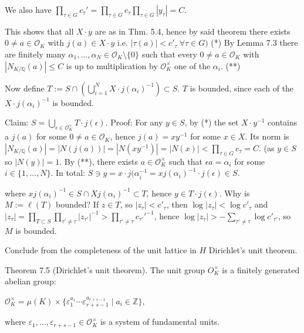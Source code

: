 We also have 
\(\prod_{\tau \in G} c_\tau' = \prod_{\tau \in G} c_\tau \prod_{\tau \in G} |y_\tau| = C\).

This shows that all \(X \cdot y\) are as in Thm. 5.4, hence by said theorem there exists
\(0 \neq a \in \mathcal{O}_K\) with \(j(a) \in X \cdot y\) i.e. \(|\tau(a)| < c'_\tau \ \forall \tau \in G)\) (*)
By Lemma 7.3 there are finitely many \(\alpha_1, \ldots, \alpha_N \in \mathcal{O}_K \setminus \{0\}\) such that every \(0 \neq a \in \mathcal{O}_K\) 
with \(|N_{K/\mathbb{Q}}(a)| \leq C\) is up to multiplication by \(\mathcal{O}_K^{\times}\) one of the \(\alpha_i\). (**)

Now define 
\(T := S \cap \left( \bigcup_{i=1}^N X \cdot j(\alpha_i)^{-1} \right) \subset S\). 
\(T\) is bounded, since each of the \(X \cdot j(\alpha_i)^{-1}\) is bounded.

Claim: \(S = \bigcup_{\epsilon \in \mathcal{O}_K^{\times}} T \cdot j(\epsilon)\).
Proof: For any \(y \in S\), by (*) the set \( X \cdot y^{-1} \) contains a \(j(a)\) for some \( 0 \neq a \in \mathcal{O}_K \), 
hence \( j(a) = xy^{-1} \) for some \( x \in X \). Its norm is
\( |N_{K/\mathbb{Q}}(a)| = |N(j(a))| = |N(xy^{-1})| = |N(x)| < \prod_{\tau \in G} c_\tau = C.\)
(as \( y \in S \) so \( |N(y)| = 1 \).
By (**), there exists \(a \in \mathcal{O}_K^{\times}\) such that \( \epsilon a = \alpha_i \) for some \( i \in \{1, \ldots, N\} \). 
In total: 
\(S \ni y = x \cdot j(\alpha_i^{-1} = xj(\alpha_i)^{-1} \cdot j(\epsilon) \in S\).

where \(x j(\alpha_i)^{-1} \in S \cap X j(\alpha_i)^{-1} \subset T\), hence \(y \in T \cdot j(\epsilon)\). 
Why is \(M := \ell(T)\) bounded? If \(z \in T\), so \(|z_\tau| < c'_\tau\), then \(\log|z_\tau| < \log c'_\tau\) and 
\(|z_\tau| = \prod_{T \subset S} \prod_{\tau' \neq \tau} |z_{\tau'}|^{-1} > \prod_{\tau' \neq \tau} c_{\tau'}'^{-1}\),
hence \(\log|z_\tau| > -\sum_{\tau' \neq \tau} \log c'_{\tau'}\), so \( M \) is bounded.

Conclude from the completeness of the unit lattice in \( H \) Dirichlet's unit theorem.

Theorem 7.5 (Dirichlet's unit theorem).
The unit group \( O_K^\times \) is a finitely generated abelian group:

\(\mathcal{O}_K^{\times} = \mu(K) \times \{ \varepsilon_1^{a_1} \cdots \varepsilon_{r+s-1}^{a_{r+s-1}} \mid a_i \in \mathbb{Z} \}\),

where \(\varepsilon_1, \ldots, \varepsilon_{r+s-1} \in \mathcal{O}_K^{\times}\) is a system of fundamental units.

